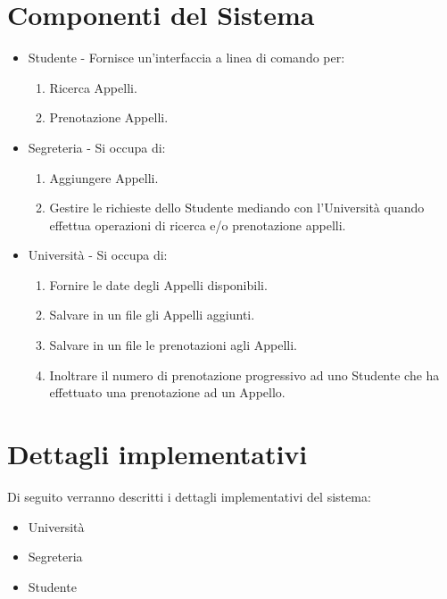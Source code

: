 \documentclass[12pt]{article}
\begin{document}
\newpage

\section{Componenti del Sistema}
\begin{itemize}
    \item Studente - Fornisce un'interfaccia a linea di comando per:
    \begin{enumerate}
        \item Ricerca Appelli.
        \item Prenotazione Appelli.
            \newline
    \end{enumerate}
    \item Segreteria - Si occupa di:
    \begin{enumerate}
        \item Aggiungere Appelli.
        \item Gestire le richieste dello Studente mediando con l'Università quando effettua operazioni di ricerca e/o prenotazione appelli.
            \newline
    \end{enumerate}
    \item Università - Si occupa di:
    \begin{enumerate}
        \item Fornire le date degli Appelli disponibili.
        \item Salvare in un file gli Appelli aggiunti.
        \item Salvare in un file le prenotazioni agli Appelli.
        \item Inoltrare il numero di prenotazione progressivo ad uno Studente che ha effettuato una prenotazione ad un Appello.         
    \end{enumerate}
    
\end{itemize}

\newpage

\section{Dettagli implementativi}
Di seguito verranno descritti i dettagli implementativi del sistema:

\begin{itemize}
    \item Università
    \item Segreteria
    \item Studente
\end{itemize}
\end{document}
